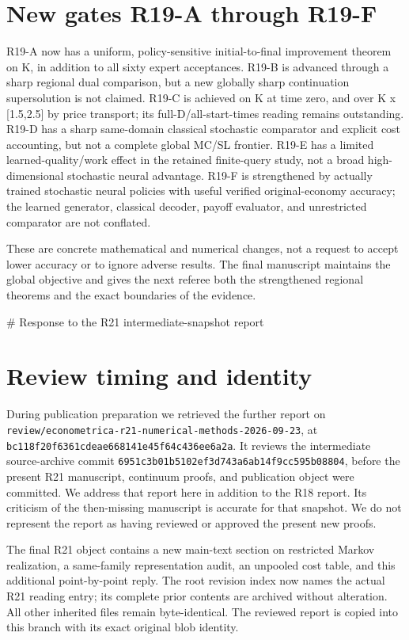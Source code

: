 \documentclass[ecta]{econsocart}
\theoremstyle{remark}
\begin{document}
\section{New gates R19-A through R19-F}
R19-A now has a uniform, policy-sensitive initial-to-final improvement theorem on K, in addition to all sixty expert acceptances. R19-B is advanced through a sharp regional dual comparison, but a new globally sharp continuation supersolution is not claimed. R19-C is achieved on K at time zero, and over K x [1.5,2.5] by price transport; its full-D/all-start-times reading remains outstanding. R19-D has a sharp same-domain classical stochastic comparator and explicit cost accounting, but not a complete global MC/SL frontier. R19-E has a limited learned-quality/work effect in the retained finite-query study, not a broad high-dimensional stochastic neural advantage. R19-F is strengthened by actually trained stochastic neural policies with useful verified original-economy accuracy; the learned generator, classical decoder, payoff evaluator, and unrestricted comparator are not conflated.

These are concrete mathematical and numerical changes, not a request to accept lower accuracy or to ignore adverse results. The final manuscript maintains the global objective and gives the next referee both the strengthened regional theorems and the exact boundaries of the evidence.

 \# Response to the R21 intermediate-snapshot report

\section{Review timing and identity}
During publication preparation we retrieved the further report on \nolinkurl{review/econometrica-r21-numerical-methods-2026-09-23}, at \nolinkurl{bc118f20f6361cdeae668141e45f64c436ee6a2a}. It reviews the intermediate source-archive commit \nolinkurl{6951c3b01b5102ef3d743a6ab14f9cc595b08804}, before the present R21 manuscript, continuum proofs, and publication object were committed. We address that report here in addition to the R18 report. Its criticism of the then-missing manuscript is accurate for that snapshot. We do not represent the report as having reviewed or approved the present new proofs.

The final R21 object contains a new main-text section on restricted Markov realization, a same-family representation audit, an unpooled cost table, and this additional point-by-point reply. The root revision index now names the actual R21 reading entry; its complete prior contents are archived without alteration. All other inherited files remain byte-identical. The reviewed report is copied into this branch with its exact original blob identity.
\end{document}
